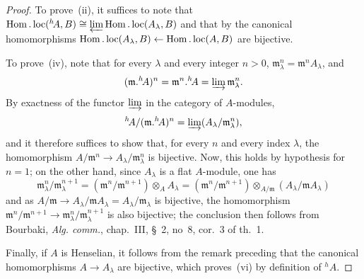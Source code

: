 \begin{proof}
To prove~(ii), it suffices to note that $\operatorname{Hom}.\operatorname{loc}({}^h\!A,B)\cong\varprojlim\operatorname{Hom}.\operatorname{loc}(A_\lambda,B)$ and that by  the canonical homomorphisms $\operatorname{Hom}.\operatorname{loc}(A_\lambda,B)\leftarrow\operatorname{Hom}.\operatorname{loc}(A,B)$ are bijective.

To prove~(iv), note that for every $\lambda$ and every integer $n>0$, $\mathfrak{m}_\lambda^n=\mathfrak{m}^nA_\lambda$, and
\[
(\mathfrak{m}.{}^h\!A)^n=\mathfrak{m}^n.{}^h\!A=\varinjlim\mathfrak{m}_\lambda^n.
\]
By exactness of the functor $\varinjlim$ in the category of $A$-modules,
\[
{}^h\!A/(\mathfrak{m}.{}^h\!A)^n=\varinjlim(A_\lambda/\mathfrak{m}_\lambda^n),
\]
and it therefore suffices to show that, for every $n$ and every index $\lambda$, the homomorphism $A/\mathfrak{m}^n\to A_\lambda/\mathfrak{m}_\lambda^n$ is bijective.
Now, this holds by hypothesis for $n=1$; on the other hand, since $A_\lambda$ is a flat $A$-module, one has
\[
  \mathfrak{m}_\lambda^n/\mathfrak{m}_\lambda^{n+1}=(\mathfrak{m}^n/\mathfrak{m}^{n+1})\otimes_{A}A_\lambda
  =(\mathfrak{m}^n/\mathfrak{m}^{n+1})\otimes_{A/\mathfrak{m}}(A_\lambda/\mathfrak{m}A_\lambda)
\]
and as $A/\mathfrak{m}\to A_\lambda/\mathfrak{m}A_\lambda=A_\lambda/\mathfrak{m}_\lambda$ is bijective, the homomorphism $\mathfrak{m}^n/\mathfrak{m}^{n+1}\to\mathfrak{m}_\lambda^n/\mathfrak{m}_\lambda^{n+1}$ is also bijective;
the conclusion then follows from Bourbaki, \emph{Alg. comm.}, chap.~III, \S~2, no~8, cor.~3 of th.~1.

Finally, if $A$ is Henselian, it follows from the remark preceding  that the canonical homomorphisms $A\to A_\lambda$ are bijective, which proves~(vi) by definition of ${}^h\!A$.
\end{proof}


